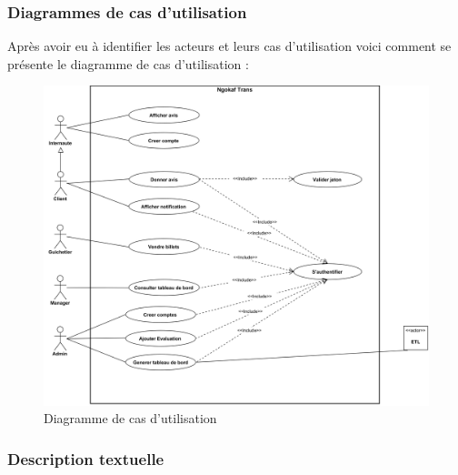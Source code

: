     \subsubsection[Diagrammes de cas d’utilisation]{Diagrammes de cas d’utilisation}
    Après avoir eu à identifier les acteurs et leurs cas d’utilisation
    voici comment se présente le diagramme de cas d’utilisation :
        \begin{figure}[H]
            \centering
            \includegraphics[width=165mm]{images/dcu_systeme.png}
            \caption{Diagramme de cas d’utilisation}
            \label{fig:dcu}
        \end{figure}

\useportrait
    \subsubsection[Description textuelle]{Description textuelle}
